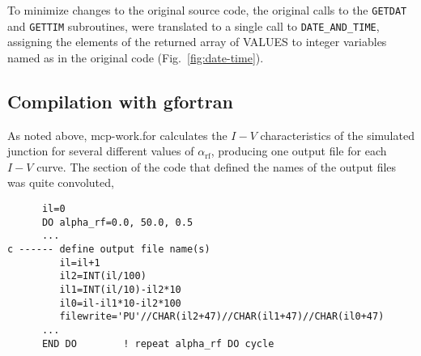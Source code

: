 To minimize changes to the original source code, the original calls to the \lstinline[columns=fixed]{GETDAT} and \lstinline[columns=fixed]{GETTIM} subroutines, were translated to a single call to \lstinline[columns=fixed]{DATE_AND_TIME}, assigning the elements of the returned array of \textsf{VALUES} to integer variables named as in the original code (Fig.~\ref{fig:date-time}).




%



\subsection{Compilation with gfortran}
\label{compilation-with-gfortran}


As noted above, \textsf{mcp-work.for} calculates the $I - V$ characteristics of the simulated junction for several different values of $\alpha_\mathrm{rf}$, producing one output file for each $I - V$ curve. The section of the code that defined the names of the output files was quite convoluted,

\begin{lstlisting}
      il=0
      DO alpha_rf=0.0, 50.0, 0.5
      ...
c ------ define output file name(s)
         il=il+1
         il2=INT(il/100)
         il1=INT(il/10)-il2*10
         il0=il-il1*10-il2*100
         filewrite='PU'//CHAR(il2+47)//CHAR(il1+47)//CHAR(il0+47)
      ...
      END DO        ! repeat alpha_rf DO cycle

\end{lstlisting}


